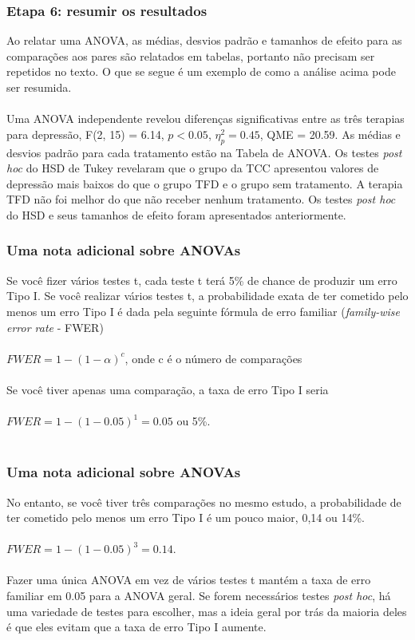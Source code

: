 \documentclass[11pt]{beamer}
\begin{document}
\begin{frame}
\frametitle{Etapa 6: resumir os resultados}

Ao relatar uma ANOVA, as médias, desvios padrão e tamanhos de efeito para as comparações aos pares são relatados em tabelas, portanto não precisam ser repetidos no texto. O que se segue é um exemplo de como a análise acima pode ser resumida.\\~\\

Uma ANOVA independente revelou diferenças significativas entre as três terapias para depressão, F(2, 15) = 6.14, $p < 0.05$, $\eta_p^2 = 0.45$, QME = 20.59. As médias e desvios padrão para cada tratamento estão na Tabela de ANOVA. Os testes \textit{post hoc} do HSD de Tukey revelaram que o grupo da TCC apresentou valores de depressão mais baixos do que o grupo TFD e o grupo sem tratamento. A terapia TFD não foi melhor do que não receber nenhum tratamento. Os testes \textit{post hoc} do HSD e seus tamanhos de efeito foram apresentados anteriormente.

\end{frame}

\begin{frame}
\frametitle{Uma nota adicional sobre ANOVAs}
Se você fizer vários testes t, cada teste t terá 5\% de chance de produzir um erro Tipo I. Se você realizar vários testes t, a probabilidade exata de ter cometido pelo menos um erro Tipo I é dada pela seguinte fórmula de erro familiar (\textit{family-wise error rate} - FWER)\\~\\

$FWER = 1-(1-\alpha)^c$, onde c é o número de comparações\\~\\

Se você tiver apenas uma comparação, a taxa de erro Tipo I seria\\~\\

$FWER = 1 - (1-0.05)^1 = 0.05$ ou 5\%.\\~\\


\end{frame}

\begin{frame}
\frametitle{Uma nota adicional sobre ANOVAs}
No entanto, se você tiver três comparações no mesmo estudo, a probabilidade de ter cometido pelo menos um erro Tipo I é um pouco maior, 0,14 ou 14\%.\\~\\

$FWER = 1 - (1 - 0.05)^3 = 0.14$.\\~\\

Fazer uma única ANOVA em vez de vários testes t mantém a taxa de erro familiar em 0.05 para a ANOVA geral. Se forem necessários testes \textit{post hoc}, há uma variedade de testes para escolher, mas a ideia geral por trás da maioria deles é que eles evitam que a taxa de erro Tipo I aumente.

\end{frame}
\end{document}
